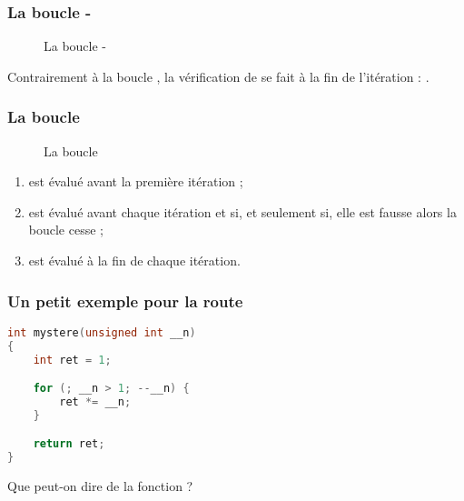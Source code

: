 \documentclass{cppcourses}
\begin{document}
\begin{frame}

\frametitle{La boucle -}

\begin{figure}
\caption{La boucle -}
\end{figure}

Contrairement à la boucle , la vérification de \mykeyword{\textcolor{red}{condition}} se fait à la fin de l'itération : .

\end{frame}

\begin{frame}

\frametitle{La boucle }

\begin{figure}
\caption{La boucle }
\end{figure}


\begin{enumerate}
    \item<3-> \mykeyword{\textcolor{teal}{déclaration ou expression}} est évalué avant la première itération ;
    \item<4-> \mykeyword{\textcolor{red}{condition}} est évalué avant chaque itération et si, et seulement si, elle est fausse alors la boucle cesse ;
    \item<5-> \mykeyword{\textcolor{orange}{expression}} est évalué à la fin de chaque itération.
\end{enumerate}

\end{frame}

\begin{frame}[fragile]

\frametitle{Un petit exemple pour la route}

\begin{example}

\begin{lstlisting}[language = c++]
int mystere(unsigned int __n)
{
    int ret = 1;

    for (; __n > 1; --__n) {
        ret *= __n;
    }

    return ret;
}
\end{lstlisting}

Que peut-on dire de la fonction  ?


\end{example}

\end{frame}
\end{document}
